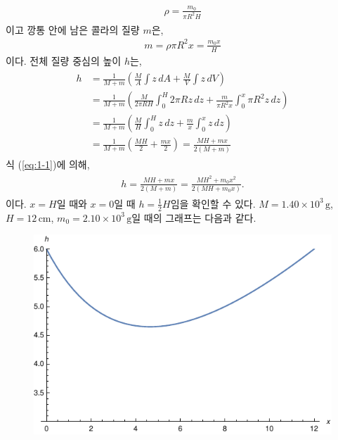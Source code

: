 \documentclass[floatfix,nofootinbib,superscriptaddress,fleqn]{revtex4-2}
\begin{document}
\begin{itemize}
\begin{align}
    \begin{split}
      \rho = \frac{m_0}{\pi R^2 H}
    \end{split}
  \end{align}
  이고 깡통 안에 남은 콜라의 질량 $m$은,
  \begin{align}\label{eq:1-1}
    m= \rho\pi R^2 x = \frac{m_0x}{H}
  \end{align}
  이다.
  전체 질량 중심의 높이 $h$는,
  \begin{align}
    \begin{split}
      h &= \frac{1}{M+m}\left(\frac{M}{A}\int z\,dA
      +\frac{M}{V}\int z\,dV\right) \\
      &= \frac{1}{M+m}\left(\frac{M}{2\pi R H}\int_0^H 2\pi R z\,dz
      +\frac{m}{\pi R^2 x}\int_0^x\pi R^2 z\,dz\right)  \\
      &= \frac{1}{M+m}\left(\frac{M}{H}\int_0^H z\,dz
      +\frac{m}{x}\int_0^x z\,dz\right) \\
      &= \frac{1}{M+m}\left(\frac{MH}{2}
      +\frac{mx}{2}\right) = \frac{MH+mx}{2(M+m)}
    \end{split}
  \end{align}
  식 (\ref{eq:1-1})에 의해,
  \begin{align}\label{eq:1-2}
    \begin{split}
      h = \frac{MH+mx}{2(M+m)}=\frac{MH^2+m_0x^2}{2(MH+m_0x)}.
    \end{split}
  \end{align}
  이다. $x=H$일 때와 $x=0$일 때 $h=\frac{1}{2}H$임을 확인할 수 있다.
  $M=1.40\times 10^{3}\,\mathrm{g}$, $H=12\,\mathrm{cm}$,
  $m_0=2.10\times 10^3\,\mathrm{g}$일 때의 그래프는 다음과 같다.
  \begin{figure}[htbp]
    \centering
    \includegraphics{Q11-1.pdf}

\end{figure}
\end{itemize}
\end{document}
